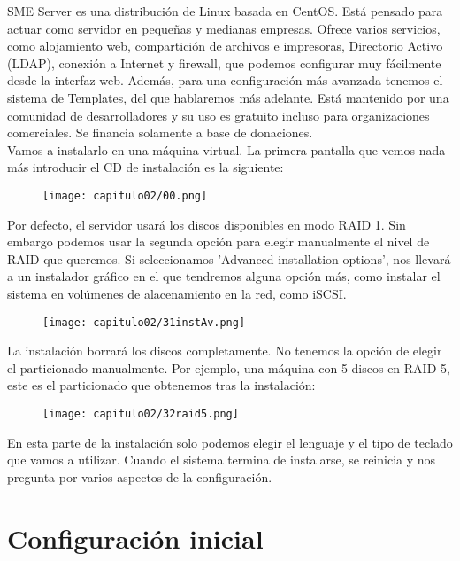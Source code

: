 SME Server es una distribución de Linux basada en CentOS. Está pensado para actuar como servidor en pequeñas y medianas empresas. Ofrece varios servicios, como alojamiento web, compartición de archivos e impresoras, Directorio Activo (LDAP), conexión a Internet y firewall, que podemos configurar muy fácilmente desde la interfaz web. Además, para una configuración más avanzada tenemos el sistema de Templates, del que hablaremos más adelante. Está mantenido por una comunidad de desarrolladores y su uso es gratuito incluso para organizaciones comerciales. Se financia solamente a base de donaciones.\\

Vamos a instalarlo en una máquina virtual. La primera pantalla que vemos nada más introducir el CD de instalación es la siguiente:

\begin{figure}[H]
    \centering
    \texttt{[image: capitulo02/00.png]}
\end{figure}

Por defecto, el servidor usará los discos disponibles en modo RAID 1. Sin embargo podemos usar la segunda opción para elegir manualmente el nivel de RAID que queremos. Si seleccionamos 'Advanced installation options', nos llevará a un instalador gráfico en el que tendremos alguna opción más, como instalar el sistema en volúmenes de alacenamiento en la red, como iSCSI.

\begin{figure}[H]
    \centering
    \texttt{[image: capitulo02/31instAv.png]}
\end{figure}

La instalación borrará los discos completamente. No tenemos la opción de elegir el particionado manualmente. Por ejemplo, una máquina con 5 discos en RAID 5, este es el particionado que obtenemos tras la instalación:

\begin{figure}[H]
    \centering
    \texttt{[image: capitulo02/32raid5.png]}
\end{figure}

En esta parte de la instalación solo podemos elegir el lenguaje y el tipo de teclado que vamos a utilizar. Cuando el sistema termina de instalarse, se reinicia y nos pregunta por varios aspectos de la configuración.

\section{Configuración inicial}

